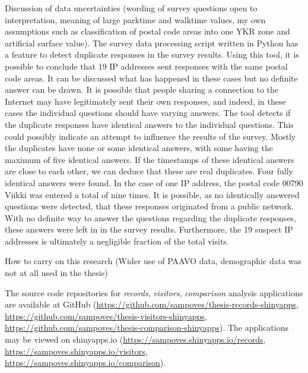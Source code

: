 Discussion of data uncertainties (wording of survey questions open to interpretation, meaning of large parktime and walktime values, my own assumptions such as classification of postal code areas into one YKR zone and artificial surface value). The survey data processing script written in Python has a feature to detect duplicate responses in the survey results. Using this tool, it is possible to conclude that 19 IP addresses sent responses with the same postal code areas. It can be discussed what has happened in these cases but no definite answer can be drawn. It is possible that people sharing a connection to the Internet may have legitimately sent their own responses, and indeed, in these cases the individual questions should have varying answers. The tool detects if the duplicate responses have identical answers to the individual questions. This could possibly indicate an attempt to influence the results of the survey. Mostly the duplicates have none or some identical answers, with some having the maximum of five identical answers. If the timestamps of these identical answers are close to each other, we can deduce that these are real duplicates. Four fully identical answers were found. In the case of one IP address, the postal code 00790 Viikki was entered a total of nine times. It is possible, as no identically answered questions were detected, that these responses originated from a public network. With no definite way to answer the questions regarding the duplicate responses, these answers were left in in the survey results. Furthermore, the 19 suspect IP addresses is ultimately a negligible fraction of the total visits.

How to carry on this research (Wider use of PAAVO data, demographic data was not at all used in the thesis)

The source code repositories for \textit{records}, \textit{visitors}, \textit{comparison} analysis applications are available at GitHub (\textcolor{blue}{\url{https://github.com/sampoves/thesis-records-shinyapps}}, \textcolor{blue}{\url{https://github.com/sampoves/thesis-visitors-shinyapps}}, \textcolor{blue}{\url{https://github.com/sampoves/thesis-comparison-shinyapps}}). The applications may be viewed on shinyapps.io (\textcolor{blue}{\url{https://sampoves.shinyapps.io/records}}, \textcolor{blue}{\url{https://sampoves.shinyapps.io/visitors}}, \textcolor{blue}{\url{https://sampoves.shinyapps.io/comparison}}).